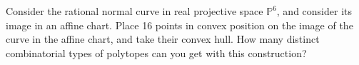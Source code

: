 Consider the rational normal curve in real projective space $\mathbb P^6$, and consider its image in an affine chart. Place 16 points in convex position on the image of the curve in the affine chart, and take their convex hull. How many distinct combinatorial types of polytopes can you get with this construction?
